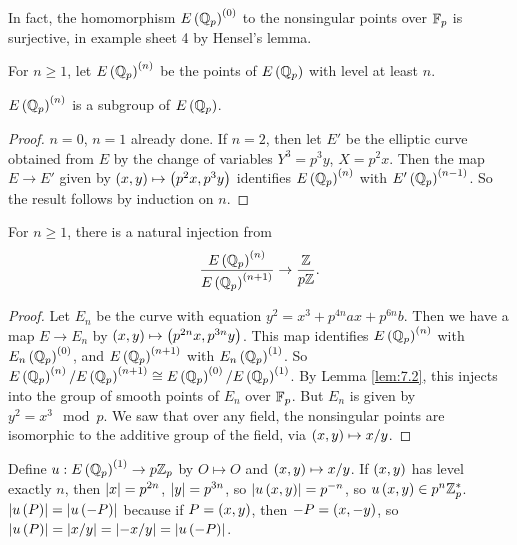 In fact, the homomorphism $ E\left( \mathbb{Q}_p \right)^{\left( 0 \right)} $ to the nonsingular points over $ \mathbb{F}_p $ is surjective, in example sheet 4 by Hensel's lemma.

\pagebreak


For $ n \ge 1 $, let $ E\left( \mathbb{Q}_p \right)^{\left( n \right)} $ be the points of $ E\left( \mathbb{Q}_p \right) $ with level at least $ n $.

\begin{corollary}
$ E\left( \mathbb{Q}_p \right)^{\left( n \right)} $ is a subgroup of $ E\left( \mathbb{Q}_p \right) $.
\end{corollary}

\begin{proof}
$ n = 0 $, $ n = 1 $ already done. If $ n = 2 $, then let $ E' $ be the elliptic curve obtained from $ E $ by the change of variables $ Y^3 = p^3y $, $ X = p^2x $. Then the map $ E \to E' $ given by $ \left( x, y \right) \mapsto \left( p^2x, p^3y \right) $ identifies $ E\left( \mathbb{Q}_p \right)^{\left( n \right)} $ with $ E'\left( \mathbb{Q}_p \right)^{\left( n - 1 \right)} $. So the result follows by induction on $ n $.
\end{proof}

\begin{corollary}
For $ n \ge 1 $, there is a natural injection from
$$ \dfrac{E\left( \mathbb{Q}_p \right)^{\left( n \right)}}{E\left( \mathbb{Q}_p \right)^{\left( n + 1 \right)}} \to \dfrac{\mathbb{Z}}{p\mathbb{Z}}. $$
\end{corollary}

\begin{proof}
Let $ E_n $ be the curve with equation $ y^2 = x^3 + p^{4n}ax + p^{6n}b $. Then we have a map $ E \to E_n $ by $ \left( x, y \right) \mapsto \left( p^{2n}x, p^{3n}y \right) $. This map identifies $ E\left( \mathbb{Q}_p \right)^{\left( n \right)} $ with $ E_n\left( \mathbb{Q}_p \right)^{\left( 0 \right)} $, and $ E\left( \mathbb{Q}_p \right)^{\left( n + 1 \right)} $ with $ E_n\left( \mathbb{Q}_p \right)^{\left( 1 \right)} $. So $ E\left( \mathbb{Q}_p \right)^{\left( n \right)} / E\left( \mathbb{Q}_p \right)^{\left( n + 1 \right)} \cong E\left( \mathbb{Q}_p \right)^{\left( 0 \right)} / E\left( \mathbb{Q}_p \right)^{\left( 1 \right)} $. By Lemma \ref{lem:7.2}, this injects into the group of smooth points of $ E_n $ over $ \mathbb{F}_p $. But $ E_n $ is given by $ y^2 = x^3 \mod p $. We saw that over any field, the nonsingular points are isomorphic to the additive group of the field, via $ \left( x, y \right) \mapsto x / y $.
\end{proof}

Define $ u : E\left( \mathbb{Q}_p \right)^{\left( 1 \right)} \to p\mathbb{Z}_p $ by $ O \mapsto O $ and $ \left( x, y \right) \mapsto x / y $. If $ \left( x, y \right) $ has level exactly $ n $, then $ \left\lvert x \right\rvert = p^{2n} $, $ \left\lvert y \right\rvert = p^{3n} $, so $ \left\lvert u\left( x, y \right) \right\rvert = p^{-n} $, so $ u\left( x, y \right) \in p^n\mathbb{Z}_p^* $. $ \left\lvert u\left( P \right) \right\rvert = \left\lvert u\left( -P \right) \right\rvert $ because if $ P = \left( x, y \right) $, then $ -P = \left( x, -y \right) $, so $ \left\lvert u\left( P \right) \right\rvert = \left\lvert x / y \right\rvert = \left\lvert -x / y \right\rvert = \left\lvert u\left( -P \right) \right\rvert $.

